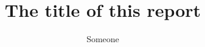 \documentclass[12pt]{ruthesis}
\title{The title of this report}
\author{Someone}
\begin{document}
  \begin{frontmatter}
   \maketitle
   \tableofcontents
  \end{frontmatter}





\printbibliography
\end{document}
